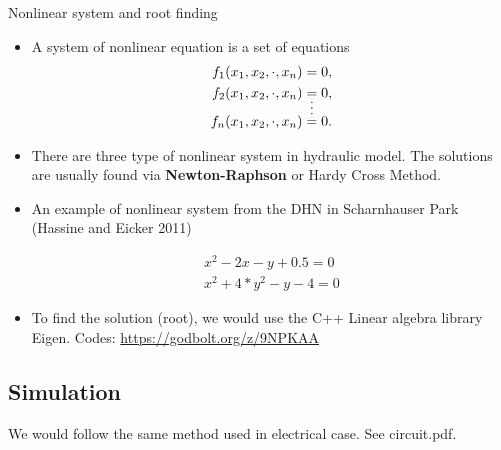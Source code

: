 \documentclass[xcolor=dvipsnames]{beamer}
\begin{document}
\begin{frame}[shrink=20]{Nonlinear system and root finding}

\begin{itemize}
	\item A system of nonlinear equation is a set of equations 
	\begin{align*}
		f_1(x_1,x_2,\cdot,x_n)&=0,\\
		f_2(x_1,x_2,\cdot,x_n)&=0,\\
		&\shortvdotswithin{=}
		f_n(x_1,x_2,\cdot,x_n)&=0.
	\end{align*}
	\item There are three type of nonlinear system in hydraulic model. The solutions are usually found via 
	\textbf{Newton-Raphson} or Hardy Cross Method.

	\item An example of nonlinear system from the DHN in Scharnhauser Park (Hassine and Eicker 2011)

	\begin{align*}
		x^2-2x-y+0.5=0\\
		x^2+4*y^2-y-4=0
	\end{align*}

	\item To find the solution (root), we would use the C++ Linear algebra library {\color{purple}Eigen}.  %
	Codes: \url{https://godbolt.org/z/9NPKAA}

\end{itemize}
\end{frame}

\subsection{Simulation}

\begin{frame}
	We would follow the same method used in electrical case. See circuit.pdf.
\end{frame}
\end{document}
